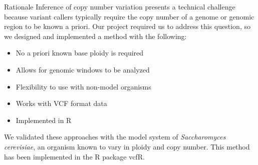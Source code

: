 
\begin{columns}[t]
  \begin{column}{0.44\textwidth}
    \begin{block}{\large Rationale}
\scriptsize
Inference of copy number variation presents a technical challenge because variant callers typically require the copy number of a genome or genomic region to be known a priori.
Our project required us to address this question, so we designed and implemented a method with the following:

\begin{itemize}
\item No a priori known base ploidy is required
\item Allows for genomic windows to be analyzed
\item Flexibility to use with non-model organisms
\item Works with VCF format data
\item Implemented in R
\end{itemize}

We validated these approaches with the model system of \textit{Saccharomyces cerevisiae}, an organism known to vary in ploidy and copy number.
This method has been implemented in the R package vcfR.
\vspace{3mm}
    \end{block}
  \end{column}


\end{columns}
